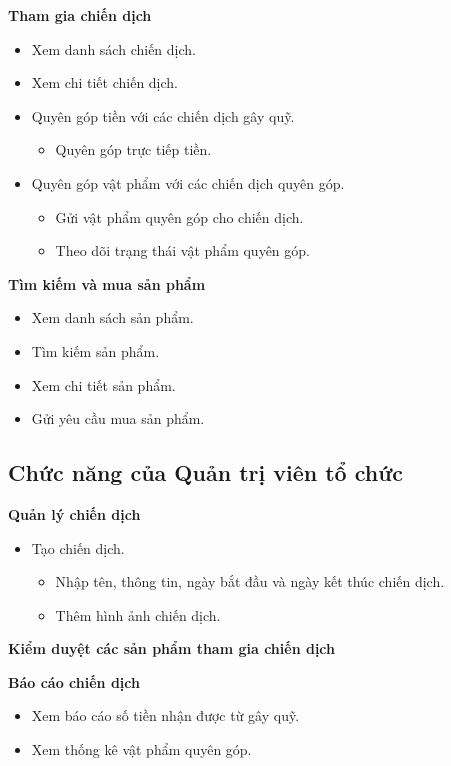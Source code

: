 \documentclass[12pt,a4paper]{report}
\begin{document}
\textbf{Tham gia chiến dịch}
\begin{itemize}[label=--, leftmargin=1.2cm]
\item Xem danh sách chiến dịch.
\item Xem chi tiết chiến dịch.
\item Quyên góp tiền với các chiến dịch gây quỹ.
\begin{itemize}[label=+, leftmargin=1.5cm]
    \item Quyên góp trực tiếp tiền.
\end{itemize}

\item Quyên góp vật phẩm với các chiến dịch quyên góp.
\begin{itemize}[label=+, leftmargin=1.5cm]
    \item Gửi vật phẩm quyên góp cho chiến dịch.
    \item Theo dõi trạng thái vật phẩm quyên góp.
\end{itemize}

\end{itemize}

\textbf{Tìm kiếm và mua sản phẩm}
\begin{itemize}[label=--, leftmargin=1.2cm]
\item Xem danh sách sản phẩm.
\item Tìm kiếm sản phẩm.
\item Xem chi tiết sản phẩm.
\item Gửi yêu cầu mua sản phẩm.
\end{itemize}

\subsection{Chức năng của Quản trị viên tổ chức}

\textbf{Quản lý chiến dịch}
\begin{itemize}[label=--, leftmargin=1.2cm]
\item Tạo chiến dịch.
\begin{itemize}[label=+, leftmargin=1.5cm]
\item Nhập tên, thông tin, ngày bắt đầu và ngày kết thúc chiến dịch.
\item Thêm hình ảnh chiến dịch.
\end{itemize}
\end{itemize}

\textbf{Kiểm duyệt các sản phẩm tham gia chiến dịch}

\textbf{Báo cáo chiến dịch}
\begin{itemize}[label=--, leftmargin=1.2cm]
\item Xem báo cáo số tiền nhận được từ gây quỹ.
\item Xem thống kê vật phẩm quyên góp.
\end{itemize}
\end{document}
